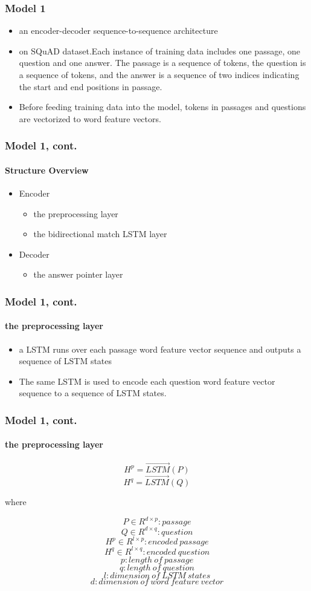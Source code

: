 \documentclass{beamer}
\begin{document}
\begin{frame} \frametitle{Model 1}
  \begin{itemize}
      \item an encoder-decoder sequence-to-sequence architecture
      \item on SQuAD dataset.Each instance of training data includes one passage, one question and one answer. The passage is a sequence of tokens, the question is a sequence of tokens, and the answer is a sequence of two indices indicating the start and end positions in passage.
      \item Before feeding training data into the model, tokens in passages and questions are vectorized to word feature vectors.
  \end{itemize}
\end{frame}

\begin{frame} \frametitle{Model 1, cont.}\framesubtitle{Structure Overview}
    \begin{itemize}
        \item Encoder
            \begin{itemize}
                \item the preprocessing layer
                \item the bidirectional match LSTM layer
            \end{itemize}
        \item Decoder
            \begin{itemize}
                \item the answer pointer layer
            \end{itemize}
    \end{itemize}

\end{frame}

\begin{frame} \frametitle{Model 1, cont.}\framesubtitle{the preprocessing layer}

    \begin{itemize}
        \item a LSTM runs over each passage word feature vector sequence and outputs a sequence of LSTM states
        \item The same LSTM is used to encode each question word feature vector sequence to a sequence of LSTM states.
    \end{itemize}
\end{frame}

\begin{frame} \frametitle{Model 1, cont.}\framesubtitle{the preprocessing layer}
    $$H^p = \overrightarrow{LSTM}(P)$$
    $$H^q = \overrightarrow{LSTM}(Q)$$

    where

    $$P\in R^{d \times p}: passage$$
    $$Q\in R^{d \times q}: question$$
    $$H^p\in R^{l \times p}: encoded\ passage$$
    $$H^q\in R^{l \times q}: encoded\ question$$
    $$p: length \ of\ passage$$
    $$q: length\ of\ question$$
    $$l: dimension\ of\ LSTM\ states$$
    $$d: dimension\ of\ word\ feature\ vector$$

\end{frame}
\end{document}
